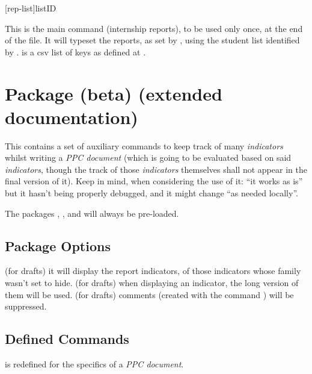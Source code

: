 \documentclass[dctools,english,tocdepth=3,secdepth=3]{ufrgscca} %
\begin{document}
\begin{Macros}{\internshipreports}
    \begin{Syntax}%
        \Macro{\internshipreports}[rep-list]{listID}
    \end{Syntax}
    This is the main command (internship reports), to be used only once, at the end of the file. It will typeset the reports, as set by \Macro{\setreports}{}, using the student list identified by .
     is a csv list of keys as defined at .
\end{Macros}

\section{ Package (beta) (extended documentation)}
This contains a set of auxiliary commands to keep track of many \emph{indicators} whilst writing  a \emph{PPC document} (which is going to be evaluated based on said \emph{indicators}, though the track of those \emph{indicators} themselves shall not appear in the final version of it). Keep in mind, when considering the use of it: “it works as is” but it hasn't being properly debugged, and it might change “as needed locally”.

The packages , ,  and  will always be pre-loaded.

\subsection{Package Options}
\begin{Options}
 (for drafts) it will display the report indicators, of those indicators whose family wasn't set to hide.
 (for drafts) when displaying an indicator, the long version of them will be used.
 (for drafts) comments (created with the command \Macro{\comment}) will be suppressed.
\end{Options}

\subsection{Defined Commands}
\begin{Macros}{\maketitle}
    \begin{Syntax}%
        \Macro{\maketitle}{}
    \end{Syntax}
\Macro{\maketitle}{} is redefined for the specifics of a \emph{PPC document}.
\end{Macros}
\end{document}
